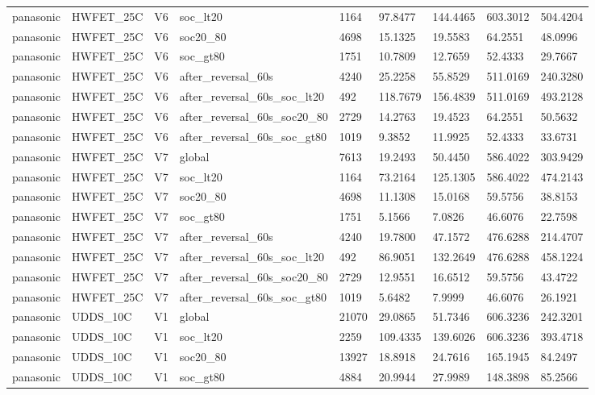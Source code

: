 \begin{tabular}{lllllllll}
panasonic & HWFET\_25C & V6 & soc\_lt20 & 1164 & 97.8477 & 144.4465 & 603.3012 & 504.4204 \\
panasonic & HWFET\_25C & V6 & soc20\_80 & 4698 & 15.1325 & 19.5583 & 64.2551 & 48.0996 \\
panasonic & HWFET\_25C & V6 & soc\_gt80 & 1751 & 10.7809 & 12.7659 & 52.4333 & 29.7667 \\
panasonic & HWFET\_25C & V6 & after\_reversal\_60s & 4240 & 25.2258 & 55.8529 & 511.0169 & 240.3280 \\
panasonic & HWFET\_25C & V6 & after\_reversal\_60s\_soc\_lt20 & 492 & 118.7679 & 156.4839 & 511.0169 & 493.2128 \\
panasonic & HWFET\_25C & V6 & after\_reversal\_60s\_soc20\_80 & 2729 & 14.2763 & 19.4523 & 64.2551 & 50.5632 \\
panasonic & HWFET\_25C & V6 & after\_reversal\_60s\_soc\_gt80 & 1019 & 9.3852 & 11.9925 & 52.4333 & 33.6731 \\
panasonic & HWFET\_25C & V7 & global & 7613 & 19.2493 & 50.4450 & 586.4022 & 303.9429 \\
panasonic & HWFET\_25C & V7 & soc\_lt20 & 1164 & 73.2164 & 125.1305 & 586.4022 & 474.2143 \\
panasonic & HWFET\_25C & V7 & soc20\_80 & 4698 & 11.1308 & 15.0168 & 59.5756 & 38.8153 \\
panasonic & HWFET\_25C & V7 & soc\_gt80 & 1751 & 5.1566 & 7.0826 & 46.6076 & 22.7598 \\
panasonic & HWFET\_25C & V7 & after\_reversal\_60s & 4240 & 19.7800 & 47.1572 & 476.6288 & 214.4707 \\
panasonic & HWFET\_25C & V7 & after\_reversal\_60s\_soc\_lt20 & 492 & 86.9051 & 132.2649 & 476.6288 & 458.1224 \\
panasonic & HWFET\_25C & V7 & after\_reversal\_60s\_soc20\_80 & 2729 & 12.9551 & 16.6512 & 59.5756 & 43.4722 \\
panasonic & HWFET\_25C & V7 & after\_reversal\_60s\_soc\_gt80 & 1019 & 5.6482 & 7.9999 & 46.6076 & 26.1921 \\
panasonic & UDDS\_10C & V1 & global & 21070 & 29.0865 & 51.7346 & 606.3236 & 242.3201 \\
panasonic & UDDS\_10C & V1 & soc\_lt20 & 2259 & 109.4335 & 139.6026 & 606.3236 & 393.4718 \\
panasonic & UDDS\_10C & V1 & soc20\_80 & 13927 & 18.8918 & 24.7616 & 165.1945 & 84.2497 \\
panasonic & UDDS\_10C & V1 & soc\_gt80 & 4884 & 20.9944 & 27.9989 & 148.3898 & 85.2566 \\

\end{tabular}
